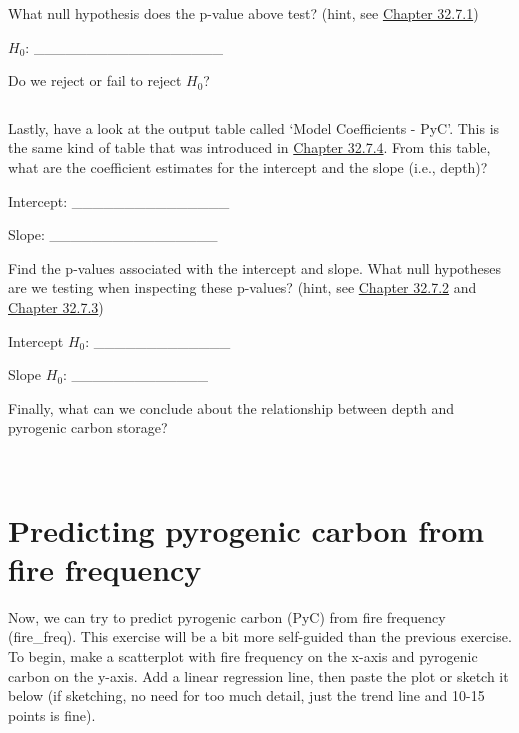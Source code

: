 \documentclass[
  openany]{krantz}
\begin{document}
What null hypothesis does the p-value above test? (hint, see \protect\hyperlink{overall-model-significance}{Chapter 32.7.1})

\(H_{0}\): \_\_\_\_\_\_\_\_\_\_\_\_\_\_\_\_\_\_

Do we reject or fail to reject \(H_{0}\)?

\begin{verbatim}
\end{verbatim}

Lastly, have a look at the output table called `Model Coefficients - PyC'.
This is the same kind of table that was introduced in \protect\hyperlink{simple-regression-output}{Chapter 32.7.4}.
From this table, what are the coefficient estimates for the intercept and the slope (i.e., depth)?

Intercept: \_\_\_\_\_\_\_\_\_\_\_\_\_\_\_

Slope: \_\_\_\_\_\_\_\_\_\_\_\_\_\_\_\_

Find the p-values associated with the intercept and slope.
What null hypotheses are we testing when inspecting these p-values? (hint, see \protect\hyperlink{significance-of-the-intercept}{Chapter 32.7.2} and \protect\hyperlink{significance-of-the-slope}{Chapter 32.7.3})

Intercept \(H_{0}\): \_\_\_\_\_\_\_\_\_\_\_\_\_

Slope \(H_{0}\): \_\_\_\_\_\_\_\_\_\_\_\_\_

Finally, what can we conclude about the relationship between depth and pyrogenic carbon storage?

\begin{verbatim}


\end{verbatim}

\hypertarget{predicting-pyrogenic-carbon-from-fire-frequency}{%
\section{Predicting pyrogenic carbon from fire frequency}\label{predicting-pyrogenic-carbon-from-fire-frequency}}

Now, we can try to predict pyrogenic carbon (PyC) from fire frequency (fire\_freq).
This exercise will be a bit more self-guided than the previous exercise.
To begin, make a scatterplot with fire frequency on the x-axis and pyrogenic carbon on the y-axis.
Add a linear regression line, then paste the plot or sketch it below (if sketching, no need for too much detail, just the trend line and 10-15 points is fine).
\end{document}
